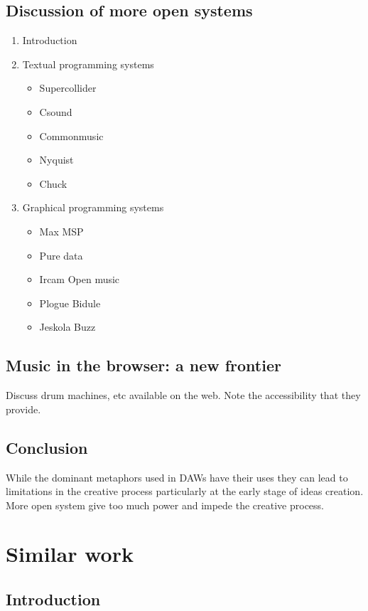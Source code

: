 \documentclass[a4paper,12pt]{article}
\begin{document}
\subsection{Discussion of more open systems}
\label{sec:org183e1d4}
\begin{enumerate}
\item Introduction
\item Textual programming systems
\begin{itemize}
\item Supercollider
\item Csound
\item Commonmusic
\item Nyquist
\item Chuck
\end{itemize}
\item Graphical programming systems
\begin{itemize}
\item Max MSP
\item Pure data
\item Ircam Open music
\item Plogue Bidule
\item Jeskola Buzz
\end{itemize}
\end{enumerate}
\subsection{Music in the browser: a new frontier}
\label{sec:org582f749}
Discuss drum machines, etc available on the web. Note the accessibility that
they provide.
\subsection{Conclusion}
\label{sec:orge35fa60}
While the dominant metaphors used in DAWs have their uses they can lead to
limitations in the creative process particularly at the early stage of ideas
creation. More open system give too much power and impede the creative process.


\section{Similar work}
\label{sec:org21aa393}
\subsection{Introduction}
\label{sec:orge91cf1d}
\end{document}
